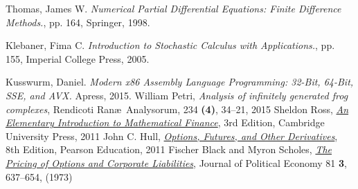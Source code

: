 \documentclass[12pt, oneside]{book}
\theoremstyle{plain}
\theoremstyle{definition}
\begin{document}

\begin{thebibliography}{12}
 Thomas, James W. {\it Numerical Partial Differential Equations: Finite Difference Methods.}, pp. 164, Springer, 1998.

Klebaner, Fima C. {\it Introduction to Stochastic Calculus with Applications.}, pp. 155, Imperial College Press, 2005.

Kusswurm, Daniel. {\it Modern x86 Assembly Language Programming: 32-Bit, 64-Bit, SSE, and AVX.} Apress, 2015.
   William Petri, 
  {\it Analysis of infinitely generated frog complexes},
	Rendicoti Ran\ae \ Analysorum, 234 {\bf (4)}, 34--21, 2015
  Sheldon Ross, {\it 
  \href{https://www-dawsonera-com.ezproxy.library.qmul.ac.uk/abstract/9781139069694}{An Elementary Introduction to Mathematical Finance}},
	3rd Edition, Cambridge University Press, 2011
	John C. Hull, 
	{\it \href{https://www-dawsonera-com.ezproxy.library.qmul.ac.uk/abstract/9781447930419}{Options, Futures, and Other Derivatives}},
	8th Edition, Pearson Education, 2011
	Fischer Black and  Myron Scholes,
	{\it \href{https://www.cs.princeton.edu/courses/archive/fall09/cos323/papers/black_scholes73.pdf}
	{The Pricing of Options and Corporate Liabilities}},
	Journal of Political Economy 81 {\bf 3}, 637--654,  (1973)
	
\end{thebibliography}
\end{document}
